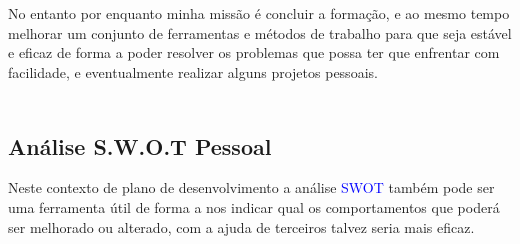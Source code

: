 \\
\\
No entanto por enquanto minha missão é concluir a formação, e ao mesmo tempo melhorar um conjunto de ferramentas e métodos de trabalho para que seja estável e eficaz de forma a poder resolver os problemas que possa ter que enfrentar com facilidade, e eventualmente realizar alguns projetos pessoais. \\
\\
\newpage
\subsection{Análise S.W.O.T Pessoal}
\qquad Neste contexto de plano de desenvolvimento a análise \textcolor{blue}{SWOT} também pode ser uma ferramenta útil de forma a nos indicar qual os comportamentos que poderá ser melhorado ou alterado, com a ajuda de terceiros talvez seria mais eficaz.
\newline
\newline
